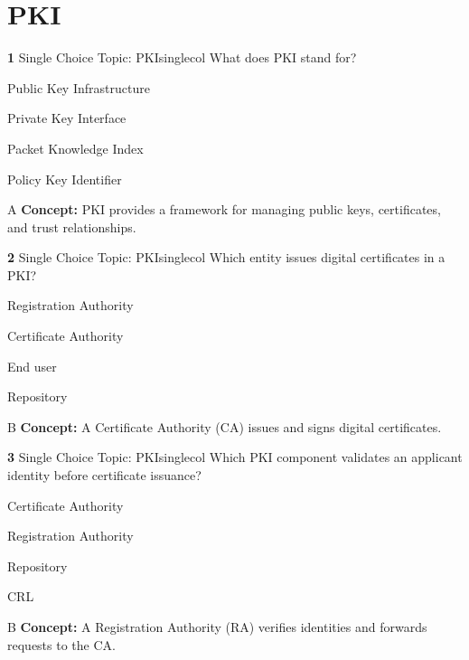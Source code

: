 \documentclass[10pt,a4paper]{article}
\begin{document}
\section{PKI}
\begin{qcard}{\color{white}\textbf{1} \hfill \small Single Choice \textbar{} Topic: PKI}{singlecol}
What does PKI stand for?

\begin{qoptions}
\item Public Key Infrastructure
\item Private Key Interface
\item Packet Knowledge Index
\item Policy Key Identifier
\end{qoptions}
\begin{explainbox}{A}
\textbf{Concept:} PKI provides a framework for managing public keys, certificates, and trust relationships.
\end{explainbox}
\end{qcard}

\begin{qcard}{\color{white}\textbf{2} \hfill \small Single Choice \textbar{} Topic: PKI}{singlecol}
Which entity issues digital certificates in a PKI?

\begin{qoptions}
\item Registration Authority
\item Certificate Authority
\item End user
\item Repository
\end{qoptions}
\begin{explainbox}{B}
\textbf{Concept:} A Certificate Authority (CA) issues and signs digital certificates.
\end{explainbox}
\end{qcard}

\begin{qcard}{\color{white}\textbf{3} \hfill \small Single Choice \textbar{} Topic: PKI}{singlecol}
Which PKI component validates an applicant identity before certificate issuance?

\begin{qoptions}
\item Certificate Authority
\item Registration Authority
\item Repository
\item CRL
\end{qoptions}
\begin{explainbox}{B}
\textbf{Concept:} A Registration Authority (RA) verifies identities and forwards requests to the CA.
\end{explainbox}
\end{qcard}
\end{document}

